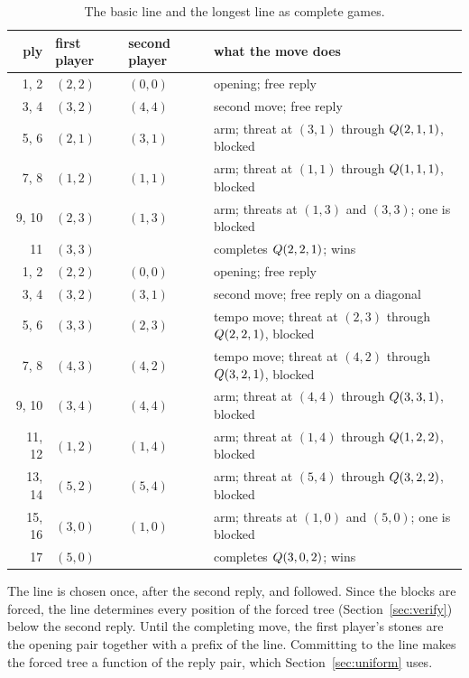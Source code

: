 \documentclass[11pt]{amsart}
\theoremstyle{definition}
\theoremstyle{remark}
\begin{document}
\begin{table}[ht]
\centering
\small
\begin{tabular}{rllp{}}
\toprule
ply & first player & second player & what the move does \\
\midrule
1, 2 & $(2,2)$ & $(0,0)$ & opening; free reply \\
3, 4 & $(3,2)$ & $(4,4)$ & second move; free reply \\
5, 6 & $(2,1)$ & $(3,1)$ & arm; threat at $(3,1)$ through $Q(2,1,1)$, blocked \\
7, 8 & $(1,2)$ & $(1,1)$ & arm; threat at $(1,1)$ through $Q(1,1,1)$, blocked \\
9, 10 & $(2,3)$ & $(1,3)$ & arm; threats at $(1,3)$ and $(3,3)$; one is blocked \\
11 & $(3,3)$ & & completes $Q(2,2,1)$; wins \\
\midrule
1, 2 & $(2,2)$ & $(0,0)$ & opening; free reply \\
3, 4 & $(3,2)$ & $(3,1)$ & second move; free reply on a diagonal \\
5, 6 & $(3,3)$ & $(2,3)$ & tempo move; threat at $(2,3)$ through $Q(2,2,1)$, blocked \\
7, 8 & $(4,3)$ & $(4,2)$ & tempo move; threat at $(4,2)$ through $Q(3,2,1)$, blocked \\
9, 10 & $(3,4)$ & $(4,4)$ & arm; threat at $(4,4)$ through $Q(3,3,1)$, blocked \\
11, 12 & $(1,2)$ & $(1,4)$ & arm; threat at $(1,4)$ through $Q(1,2,2)$, blocked \\
13, 14 & $(5,2)$ & $(5,4)$ & arm; threat at $(5,4)$ through $Q(3,2,2)$, blocked \\
15, 16 & $(3,0)$ & $(1,0)$ & arm; threats at $(1,0)$ and $(5,0)$; one is blocked \\
17 & $(5,0)$ & & completes $Q(3,0,2)$; wins \\
\bottomrule
\end{tabular}
\medskip
\caption{The basic line and the longest line as complete games.}
\label{tab:games}
\end{table}

The line is chosen once, after the second reply, and followed. Since
the blocks are forced, the line determines every position of the forced
tree (Section~\ref{sec:verify}) below the second reply. Until the
completing move, the first player's stones are the opening pair
together with a prefix of the line. Committing to the line makes the
forced tree a function of the reply pair, which
Section~\ref{sec:uniform} uses.
\end{document}
